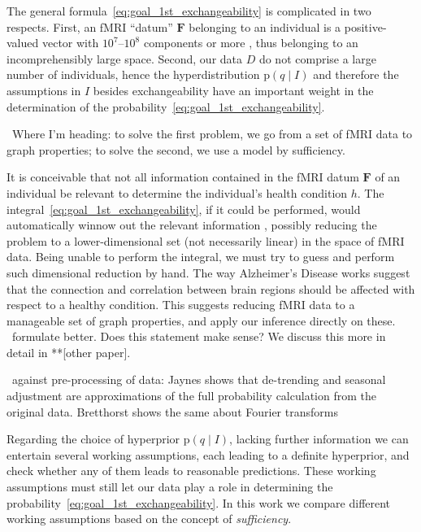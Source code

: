 \documentclass[\ifafour a4paper,12pt,\else a5paper,10pt,\fi%
onecolumn,oneside,article,%
british%
]{memoir}
\theoremstyle{remark}
\theoremstyle{innote}
\newcommand*{\citep}{\parencites}
\newcommand*{\citey}{\parencites*}
\newcommand*{\pf}{\mathrm{p}}%
\renewcommand*{\|}{\mathpunct{|}}
\newcommand*{\sects}{\S\S}%
\newcommand*{\puzzle}{\maltese}
\newcommand{\mynote}[1]{ {\color{notecolour}\puzzle\ #1}}
\newcommand*{\yH}{h}
\newcommand*{\yD}{D}
\newcommand*{\yF}{\bm{F}}
\newcommand*{\yp}{q}
\newcommand*{\yI}{I}
\theoremstyle{plain}
\begin{document}
The general formula~\eqref{eq:goal_1st_exchangeability} is complicated in
two respects. First, an fMRI \enquote{datum} $\yF$ belonging to an
individual is a positive-valued vector with $10^7$--$10^8$ components or
more \citep{lindquist2008}, thus belonging to an incomprehensibly large
space. Second, our data $\yD$ do not comprise a large number of
individuals, hence the hyperdistribution $\pf(\yp \|\yI)$ and therefore the
assumptions in $\yI$ besides exchangeability have an important weight in
the determination of the probability~\eqref{eq:goal_1st_exchangeability}.

\mynote{Where I'm heading: to solve the first problem, we go from a set of fMRI
data to graph properties; to solve the second, we use a model by
sufficiency.}

It is conceivable that not all information contained in the fMRI datum
$\yF$ of an individual be relevant to determine the individual's health
condition $\yH$. The integral~\eqref{eq:goal_1st_exchangeability}, if it
could be performed, would automatically winnow out the relevant information
\citep{jaynes1994_r2003}, possibly reducing the problem to a
lower-dimensional set (not necessarily linear) in the space of fMRI data.
Being unable to perform the integral, we must try to guess and perform such
dimensional reduction by hand. The way Alzheimer's Disease works suggest
that the connection and correlation between brain regions should be
affected with respect to a healthy condition. This suggests reducing fMRI
data to a manageable set of graph properties, and apply our inference
directly on these. \mynote{formulate better. Does this statement make
  sense?} We discuss this more in detail in **[other paper].


\mynote{against pre-processing of data: Jaynes \citey[\sects~17.5.1,
  17.10]{jaynes1994_r2003} shows that de-trending and seasonal adjustment
  are approximations of the full probability calculation from the original
  data. Bretthorst \citey{bretthorst1988,bretthorst1990} shows the same
  about Fourier transforms}

Regarding the choice of hyperprior $\pf(\yp \|\yI)$, lacking further
information we can entertain several working assumptions, each leading to a
definite hyperprior, and check whether any of them leads to reasonable
predictions. These working assumptions must still let our data play a role
in determining the probability~\eqref{eq:goal_1st_exchangeability}. In this
work we compare different working assumptions based on the concept of
\emph{sufficiency}.
\end{document}
